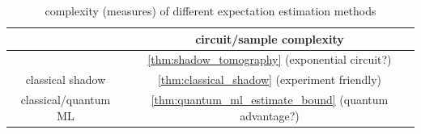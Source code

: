 \documentclass[
aps,
pra,
twocolumn,
floatfix,
]{revtex4-2}
\theoremstyle{plain}
\newtheorem{theorem}{Theorem}
\theoremstyle{definition}
\newcommand{\dm}{\rho}
\begin{document}
\begin{table}[!ht]
	\centering
	\begin{tabular}{c|c}
		& circuit/sample complexity \\
		\hline
		\nameref{prm:shadow_tomography} & \cref{thm:shadow_tomography} (exponential circuit?) \\  
		classical shadow & \cref{thm:classical_shadow} (experiment friendly)  \\
		classical/quantum ML  &  %
		\cref{thm:quantum_ml_estimate_bound} (quantum advantage?)\\  
		\hline
	\end{tabular}
	\caption{complexity (measures) of different expectation estimation methods}
\end{table}
	



\end{document}
